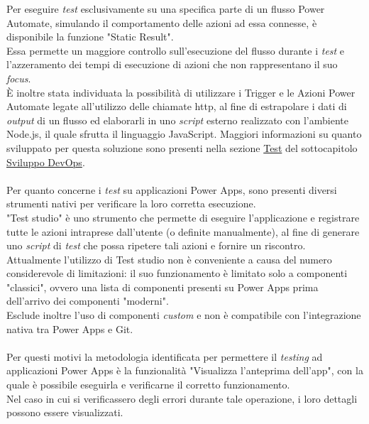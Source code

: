 \newpage \noindent Per eseguire \emph{test} esclusivamente su una specifica parte di un flusso Power Automate, simulando il comportamento delle azioni ad essa connesse, è disponibile la funzione "Static Result".\\
Essa permette un maggiore controllo sull'esecuzione del flusso durante i \emph{test} e l'azzeramento dei tempi di esecuzione di azioni che non rappresentano il suo \emph{focus}.\\
È inoltre stata individuata la possibilità di utilizzare i Trigger e le Azioni Power Automate legate all'utilizzo delle chiamate \gls{http}, al fine di estrapolare i dati di \emph{output} di un flusso ed elaborarli in uno \emph{script} esterno realizzato con l'ambiente Node.js, il quale sfrutta il linguaggio JavaScript. Maggiori informazioni su quanto sviluppato per questa soluzione sono presenti nella sezione \hyperref[testProgrammazione]{Test} del sottocapitolo \hyperref[Sviluppo DevOps]{Sviluppo DevOps}.\\\\
Per quanto concerne i \emph{test} su applicazioni Power Apps, sono presenti diversi strumenti nativi per verificare la loro corretta esecuzione.\\
"Test studio" è uno strumento che permette di eseguire l'applicazione e registrare tutte le azioni intraprese dall'utente (o definite manualmente), al fine di generare uno \emph{script} di \emph{test} che possa ripetere tali azioni e fornire un riscontro.\\
Attualmente l'utilizzo di Test studio non è conveniente a causa del numero considerevole di limitazioni:
il suo funzionamento è limitato solo a componenti "classici", ovvero una lista di componenti presenti su Power Apps prima dell'arrivo dei componenti "moderni".\\
Esclude inoltre l'uso di componenti \emph{custom} e non è compatibile con l'integrazione nativa tra Power Apps e Git.\\\\
Per questi motivi la metodologia identificata per permettere il \emph{testing} ad applicazioni Power Apps è la funzionalità "Visualizza l'anteprima dell'app", con la quale è possibile eseguirla e verificarne il corretto funzionamento.\\
Nel caso in cui si verificassero degli errori durante tale operazione, i loro dettagli possono essere visualizzati. 

